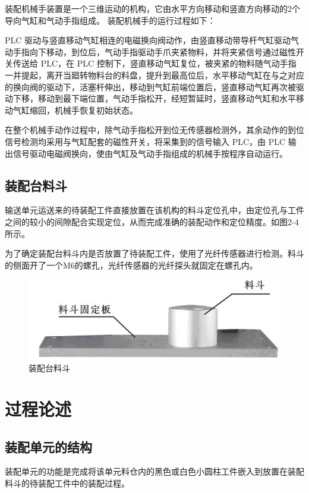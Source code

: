 \documentclass[12pt]{article}
\begin{document}
装配机械手装置是一个三维运动的机构，它由水平方向移动和竖直方向移动的2个导向气缸和气动手指组成。 装配机械手的运行过程如下：

PLC 驱动与竖直移动气缸相连的电磁换向阀动作，由竖直移动带导杆气缸驱动气动手指向下移动，到位后，气动手指驱动手爪夹紧物料，并将夹紧信号通过磁性开关传送给 PLC，在 PLC 控制下，竖直移动气缸复位，被夹紧的物料随气动手指一并提起，离开当廻转物料台的料盘，提升到最高位后，水平移动气缸在与之对应的换向阀的驱动下，活塞杆伸出，移动到气缸前端位置后，竖直移动气缸再次被驱动下移，移动到最下端位置，气动手指松开，经短暂延时，竖直移动气缸和水平移动气缸缩回，机械手恢复初始状态。 

在整个机械手动作过程中，除气动手指松开到位无传感器检测外，其余动作的到位信号检测均采用与气缸配套的磁性开关，将采集到的信号输入 PLC，由 PLC 输出信号驱动电磁阀换向，使由气缸及气动手指组成的机械手按程序自动运行。 

\subsection{装配台料斗}
输送单元运送来的待装配工件直接放置在该机构的料斗定位孔中，由定位孔与工件之间的较小的间隙配合实现定位，从而完成准确的装配动作和定位精度。如图2-4所示。

为了确定装配台料斗内是否放置了待装配工件，使用了光纤传感器进行检测。料斗的侧面开了一个M6的螺孔，光纤传感器的光纤探头就固定在螺孔内。 
\begin{figure}[htbp]
    \centering
    \includegraphics[scale=0.8]{fig/2-4.jpg}
    \caption{装配台料斗}
\end{figure} 
\pagebreak

\section{过程论述}
\subsection{装配单元的结构}
装配单元的功能是完成将该单元料仓内的黑色或白色小圆柱工件嵌入到放置在装配料斗的待装配工件中的装配过程。
\end{document}
